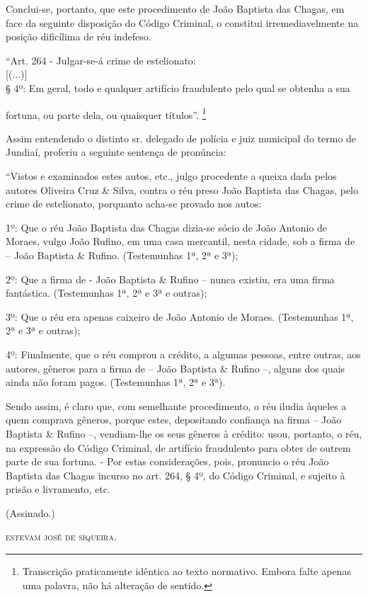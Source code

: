 {Conclui-se, portanto, que este procedimento de João Baptista das Chagas,
em face da seguinte disposição do Código Criminal, o constitui
irremediavelmente na posição dificílima de réu indefeso.

``Art. 264 - Julgar-se-á crime de estelionato:\\
{[}(...){]}\\
§ 4º: Em geral, todo e qualquer artifício fraudulento pelo qual se
obtenha a sua

fortuna, ou parte dela, ou quaisquer títulos''. \footnote{ Transcrição
  praticamente idêntica ao texto normativo. Embora falte apenas uma
  palavra, não há alteração de sentido.}

Assim entendendo o distinto sr. delegado de polícia e juiz municipal do
termo de Jundiaí, proferiu a seguinte sentença de pronúncia:

``Vistos e examinados estes autos, etc., julgo procedente a queixa dada
pelos autores Oliveira Cruz \& Silva, contra o réu preso João Baptista
das Chagas, pelo crime de estelionato, porquanto acha-se provado nos
autos:

1º: Que o réu João Baptista das Chagas dizia-se sócio de João Antonio de
Moraes, vulgo João Rufino, em uma casa mercantil, nesta cidade, sob a
firma de -- João Baptista \& Rufino. (Testemunhas 1ª, 2ª e 3ª);

2º: Que a firma de - João Baptista \& Rufino -- nunca existiu, era uma
firma fantástica. (Testemunhas 1ª, 2ª e 3ª e outras);

3º: Que o réu era apenas caixeiro de João Antonio de Moraes.
(Testemunhas 1ª, 2ª e 3ª e outras);

4º: Finalmente, que o réu comprou a crédito, a algumas pessoas, entre
outras, aos autores, gêneros para a firma de -- João Baptista \& Rufino
--, alguns dos quais ainda não foram pagos. (Testemunhas 1ª, 2ª e 3ª).

Sendo assim, é claro que, com semelhante procedimento, o réu iludia
àqueles a quem comprava gêneros, porque estes, depositando confiança na
firma -- João Baptista \& Rufino --, vendiam-lhe os seus gêneros à
crédito: usou, portanto, o réu, na expressão do Código Criminal, de
artifício fraudulento para obter de outrem parte de sua fortuna. - Por
estas considerações, pois, pronuncio o réu João Baptista das Chagas
incurso no art. 264, § 4º, do Código Criminal, e sujeito à prisão e
livramento, etc.

(Assinado.)
\begin{flushright}
\textsc{estevam josé de siqueira.}
\end{flushright}
\asterisc{}

}

